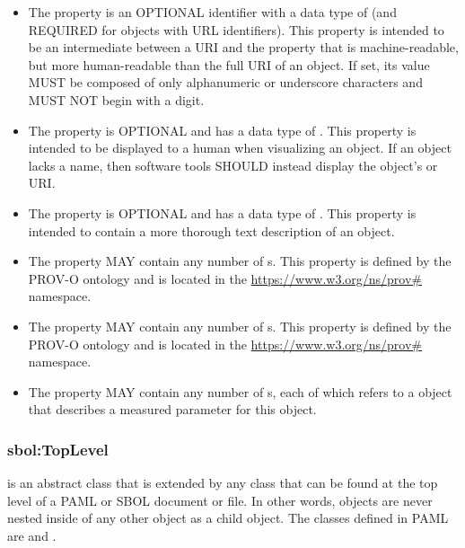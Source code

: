 \begin{itemize}
\item \label{sec:sbol:displayId} 
The  property is an OPTIONAL identifier with a data type of  (and REQUIRED for objects with URL identifiers). This property is intended to be an intermediate between a URI and the  property that is machine-readable, but more human-readable than the full URI of an object.
If set, its  value MUST be composed of only alphanumeric or underscore characters and MUST NOT begin with a digit.

\item \label{sec:sbol:name}
The  property is OPTIONAL and has a data type of . This property is intended to be displayed to a human when visualizing an  object.
If an  object lacks a name, then software tools SHOULD instead display the object's  or URI.

\item \label{sec:sbol:description}
The  property is OPTIONAL and has a data type of . This property is intended to contain a more thorough text description of an  object.

\item \label{sec:prov:wasDerivedFrom}
The  property MAY contain any number of s. This property is defined by the PROV-O ontology and is located in the \url{https://www.w3.org/ns/prov#} namespace.

\item \label{sec:prov:wasGeneratedBy}
The  property MAY contain any number of s. This property is defined by the PROV-O ontology and is located in the \url{https://www.w3.org/ns/prov#} namespace.

\item \label{sec:sbol:hasMeasure}
The  property MAY contain any number of s, each of which refers to a  object that describes a measured parameter for this object.
\end{itemize}

\subsubsection{sbol:TopLevel}
\label{sec:sbol:TopLevel}

 is an abstract class that is extended by any  class that can be found at the top level of a PAML or SBOL document or file.
In other words,  objects are never nested inside of any other object as a child object.
The  classes defined in PAML are  and . 

